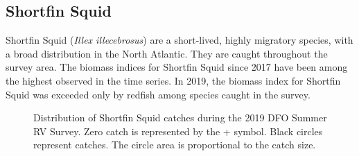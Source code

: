 \documentclass[11pt]{book}
\begin{document}
\hypertarget{shortfin-squid}{%
\subsection{Shortfin Squid}\label{shortfin-squid}}

Shortfin Squid (\emph{Illex illecebrosus}) are a short-lived, highly migratory species, with a broad distribution in the North Atlantic. They are caught throughout the survey area. The biomass indices for Shortfin Squid since 2017 have been among the highest observed in the time series. In 2019, the biomass index for Shortfin Squid was exceeded only by redfish among species caught in the survey.


\begin{figure}[htb]

{\centering {} 

}

\caption{Distribution of Shortfin Squid catches during the 2019 DFO Summer RV Survey. Zero catch is represented by the + symbol. Black circles represent catches. The circle area is proportional to the catch size.}\label{fig:128-map-shortfinsquid}
\end{figure}
\end{document}
